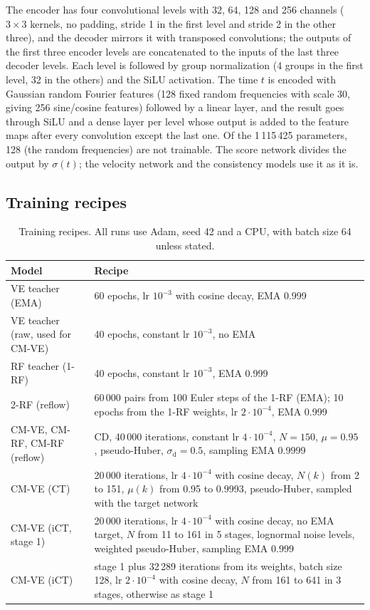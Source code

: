 \documentclass{article}
\begin{document}
The encoder has four convolutional levels with 32, 64, 128 and 256 channels
($3\times3$ kernels, no padding, stride 1 in the first level and stride 2 in
the other three), and the decoder mirrors it with transposed convolutions;
the outputs of the first three encoder levels are concatenated to the inputs
of the last three decoder levels. Each level is followed by group
normalization (4 groups in the first level, 32 in the others) and the SiLU
activation. The time $t$ is encoded with Gaussian random Fourier features
(128 fixed random frequencies with scale 30, giving 256 sine/cosine features)
followed by a linear layer, and the result goes through SiLU and a dense layer
per level whose output is added to the feature maps after every convolution
except the last one. Of the 1\,115\,425 parameters, 128 (the random
frequencies) are not trainable. The score network divides the output by
$\sigma(t)$; the velocity network and the consistency models use it as it is.

\subsection{Training recipes}
\label{sec:app_recipes}

\begin{table}[!htbp]
  \caption{Training recipes. All runs use Adam, seed 42 and a CPU, with batch
  size 64 unless stated.}
  \label{tab:recipes}
  \centering
  \footnotesize
  \begin{tabular}{p{3.4cm}p{8.9cm}}
    \toprule
    Model & Recipe \\
    \midrule
    VE teacher (EMA) & 60 epochs, lr $10^{-3}$ with cosine decay, EMA 0.999 \\
    VE teacher (raw, used for CM-VE) & 40 epochs, constant lr $10^{-3}$, no EMA \\
    RF teacher (1-RF) & 40 epochs, constant lr $10^{-3}$, EMA 0.999 \\
    2-RF (reflow) & 60\,000 pairs from 100 Euler steps of the 1-RF (EMA); 10 epochs from the 1-RF weights, lr $2\cdot10^{-4}$, EMA 0.999 \\
    CM-VE, CM-RF, CM-RF (reflow) & CD, 40\,000 iterations, constant lr $4\cdot10^{-4}$, $N = 150$, $\mu = 0.95$, pseudo-Huber, $\sigma_\text{d} = 0.5$, sampling EMA 0.9999 \\
    CM-VE (CT) & 20\,000 iterations, lr $4\cdot10^{-4}$ with cosine decay, $N(k)$ from 2 to 151, $\mu(k)$ from 0.95 to 0.9993, pseudo-Huber, sampled with the target network \\
    CM-VE (iCT, stage 1) & 20\,000 iterations, lr $4\cdot10^{-4}$ with cosine decay, no EMA target, $N$ from 11 to 161 in 5 stages, lognormal noise levels, weighted pseudo-Huber, sampling EMA 0.999 \\
    CM-VE (iCT) & stage 1 plus 32\,289 iterations from its weights, batch size 128, lr $2\cdot10^{-4}$ with cosine decay, $N$ from 161 to 641 in 3 stages, otherwise as stage 1 \\
    \bottomrule
  \end{tabular}
\end{table}
\end{document}
